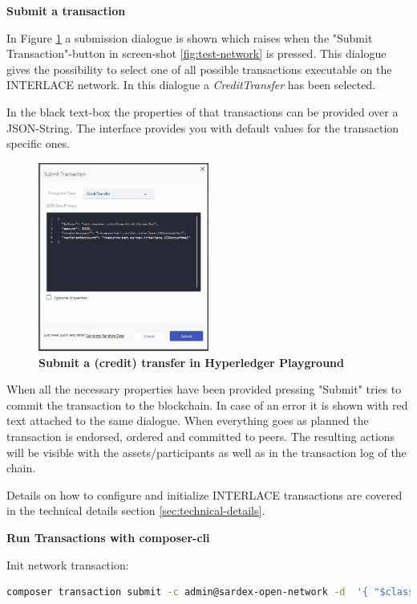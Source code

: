 \textbf{Submit a transaction}

In Figure \ref{fig:submit-credit-transfer} a submission dialogue is shown which raises when the "Submit Transaction"-button in screen-shot \ref{fig:test-network} is pressed. This dialogue gives the possibility to select one of all possible transactions executable on the INTERLACE network. In this dialogue a \textit{CreditTransfer} has been selected.

In the black text-box the properties of that transactions can be provided over a JSON-String. The interface provides you with default values for the transaction specific ones.

\begin{figure}[htbp]
  \centering
  \includegraphics[width=0.5\textwidth]{Figures/submit-credit-transfer}
  \caption{\bf\small Submit a (credit) transfer in Hyperledger Playground}
  \label{fig:submit-credit-transfer}
\end{figure}

When all the necessary properties have been provided pressing "Submit" tries to commit the transaction to the blockchain. In case of an error it is shown with red text attached to the same dialogue. When everything goes as planned the transaction is endorsed, ordered and committed to peers. The resulting actions will be visible with the assets/participants as well as in the transaction log of the chain.

Details on how to configure and initialize INTERLACE transactions are covered in the technical details section \ref{sec:technical-details}.

\textbf{Run Transactions with composer-cli}

Init network transaction:

\begin{lstlisting}[language=bash]
	composer transaction submit -c admin@sardex-open-network -d  '{ "$class": "net.sardex.interlace.InitBlockchain" }'
\end{lstlisting}

